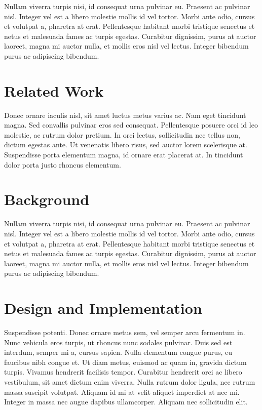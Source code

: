 \documentclass{acm_proc_article-sp}
\begin{document}
Nullam viverra turpis nisi, id consequat urna pulvinar eu. Praesent ac pulvinar
nisl. Integer vel est a libero molestie mollis id vel tortor. Morbi ante odio,
cursus et volutpat a, pharetra at erat. Pellentesque habitant morbi tristique
senectus et netus et malesuada fames ac turpis egestas. Curabitur dignissim,
purus at auctor laoreet, magna mi auctor nulla, et mollis eros nisl vel lectus.
Integer bibendum purus ac adipiscing bibendum.

\section{Related Work}
Donec ornare iaculis nisl, sit amet luctus metus varius ac. Nam eget tincidunt
magna. Sed convallis pulvinar eros sed consequat. Pellentesque posuere orci id
leo molestie, ac rutrum dolor pretium. In orci lectus, sollicitudin nec tellus
non, dictum egestas ante. Ut venenatis libero risus, sed auctor lorem
scelerisque at. Suspendisse porta elementum magna, id ornare erat placerat at.
In tincidunt dolor porta justo rhoncus elementum.

\section{Background}
Nullam viverra turpis nisi, id consequat urna pulvinar eu. Praesent ac pulvinar
nisl. Integer vel est a libero molestie mollis id vel tortor. Morbi ante odio,
cursus et volutpat a, pharetra at erat. Pellentesque habitant morbi tristique
senectus et netus et malesuada fames ac turpis egestas. Curabitur dignissim,
purus at auctor laoreet, magna mi auctor nulla, et mollis eros nisl vel lectus.
Integer bibendum purus ac adipiscing bibendum.

\section{Design and Implementation}
Suspendisse potenti. Donec ornare metus sem, vel semper arcu fermentum in. Nunc
vehicula eros turpis, ut rhoncus nunc sodales pulvinar. Duis sed est interdum,
semper mi a, cursus sapien. Nulla elementum congue purus, eu faucibus nibh
congue et. Ut diam metus, euismod ac quam in, gravida dictum turpis. Vivamus
hendrerit facilisis tempor. Curabitur hendrerit orci ac libero vestibulum, sit
amet dictum enim viverra. Nulla rutrum dolor ligula, nec rutrum massa suscipit
volutpat. Aliquam id mi at velit aliquet imperdiet at nec mi. Integer in massa
nec augue dapibus ullamcorper. Aliquam nec sollicitudin elit.
\end{document}
